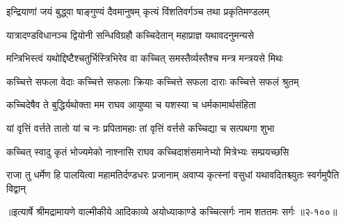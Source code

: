 \twolineshloka
{इन्द्रियाणां जयं बुद्ध्वा षाङ्गुण्यं दैवमानुषम्}
{कृत्यं विंशतिवर्गञ्च तथा प्रकृतिमण्डलम्} %

\twolineshloka
{यात्रादण्डविधानञ्च द्वियोनी सन्धिविग्रहौ}
{कच्चिदेतान् महाप्राज्ञ यथावदनुमन्यसे} %

\twolineshloka
{मन्त्रिभिस्त्वं यथोद्दिष्टैश्चतुर्भिस्त्रिभिरेव वा}
{कच्चित् समस्तैर्व्यस्तैश्च मन्त्र मन्त्रयसे मिथः} %

\twolineshloka
{कच्चित्ते सफला वेदाः कच्चित्ते सफलाः क्रियाः}
{कच्चित्ते सफला दाराः कच्चित्ते सफलं श्रुतम्} %

\twolineshloka
{कच्चिदेषैव ते बुद्धिर्यथोक्ता मम राघव}
{आयुष्या च यशस्या च धर्मकामार्थसंहिता} %

\twolineshloka
{यां वृत्तिं वर्त्तते तातो यां च नः प्रपितामहाः}
{तां वृत्तिं वर्त्तसे कच्चिद्या च सत्पथगा शुभा} %

\twolineshloka
{कच्चित् स्वादु कृतं भोज्यमेको नाश्नासि राघव}
{कच्चिदाशंसमानेभ्यो मित्रेभ्यः सम्प्रयच्छसि} %

\twolineshloka
{राजा तु धर्मेण हि पालयित्वा महामतिर्दण्डधरः प्रजानाम्}
{अवाप्य कृत्स्नां वसुधां यथावदितश्च्युतः स्वर्गमुपैति विद्वान्} %


॥इत्यार्षे श्रीमद्रामायणे वाल्मीकीये आदिकाव्ये अयोध्याकाण्डे कच्चित्सर्गः नाम शततमः सर्गः ॥२-१००॥
